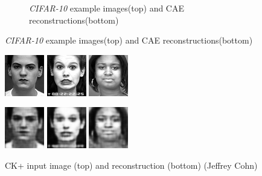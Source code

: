 \documentclass{article}
\begin{document}
\begin{figure}
\begin{subfigure}{0.45\linewidth}
      \caption{\emph{CIFAR-10} example images(top) and CAE reconstructions(bottom)}
      \label{fig:cifar_reconstructions}

      \end{subfigure}
      

    \end{figure}

    \begin{figure}%
      \centering
      \includegraphics[width=0.2\linewidth]{../graphics/reconstructions/ckplus/input_00.png}
      \includegraphics[width=0.2\linewidth]{../graphics/reconstructions/ckplus/input_01.png}
      \includegraphics[width=0.2\linewidth]{../graphics/reconstructions/ckplus/input_02.png}

      \includegraphics[width=0.2\linewidth]{../graphics/reconstructions/ckplus/reconstruction_00.png}
      \includegraphics[width=0.2\linewidth]{../graphics/reconstructions/ckplus/reconstruction_01.png}
      \includegraphics[width=0.2\linewidth]{../graphics/reconstructions/ckplus/reconstruction_02.png}

      \caption{CK+ input image (top) and reconstruction (bottom) ({\textcopyright}Jeffrey Cohn)}
      \label{fig:ckplus_reconstructions}
    \end{figure}
\end{document}
